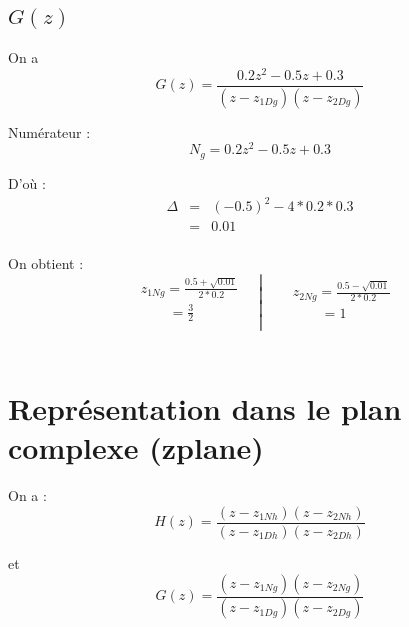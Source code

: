\documentclass[12,french]{report}
\begin{document}
\subsection{$G(z)$}

\vspace{0.25cm}

On a $$ G(z) = \frac{0.2z^2-0.5z+0.3}{(z-z_{1Dg})(z-z_{2Dg})} $$

Numérateur : $$ N_g= 0.2z^2-0.5z+0.3 $$

D'où : $$ \begin{array}{ccl}
\Delta & = & (-0.5)^2-4*0.2*0.3 \\
	   & = & 0.01 \\
\end{array} $$

On obtient :
$$\left.\begin{aligned}
	&z_{1Ng} = \frac{0.5+\sqrt{0.01}}{2*0.2} \\
	&\quad\quad = \frac{3}{2} \\
\end{aligned}\quad\right|
\quad\left.\begin{aligned}
	&z_{2Ng} = \frac{0.5-\sqrt{0.01}}{2*0.2}\\
	&\quad\quad = 1 \\
\end{aligned}\right.$$\\

\section{Représentation dans le plan complexe (zplane)}

\vspace{0.25cm}
On a :
$$ H(z) = \frac{(z-z_{1Nh})(z-z_{2Nh})}{(z-z_{1Dh})(z-z_{2Dh})} $$

et
$$ G(z) = \frac{(z-z_{1Ng})(z-z_{2Ng})}{(z-z_{1Dg})(z-z_{2Dg})} $$
\end{document}

